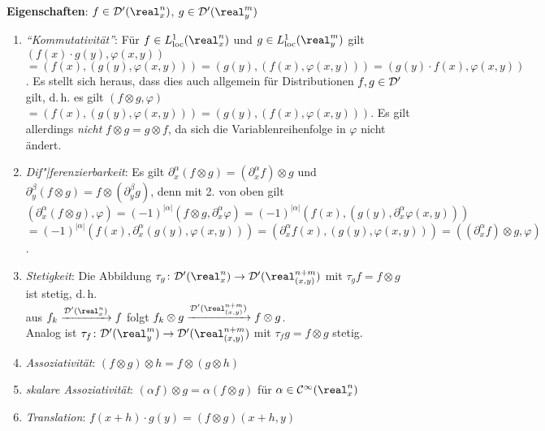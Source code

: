 \textbf{Eigenschaften}: $f \in \D'(\real^n_x)$, $g \in \D'(\real^m_y)$
\begin{enumerate}
    \item
    \emph{"`Kommutativität"'}:
    Für $f \in L^1_\loc(\real^n_x)$ und $g \in L^1_\loc(\real^m_y)$ gilt
    $(f(x) \cdot g(y), \varphi(x, y))$\\
    $= (f(x), (g(y), \varphi(x, y))) =
    (g(y), (f(x), \varphi(x, y))) = (g(y) \cdot f(x), \varphi(x, y))$.
    Es stellt sich heraus, dass dies auch allgemein für Distributionen
    $f, g \in \mathcal{D}'$ gilt, d.\,h. es gilt
    $(f \otimes g, \varphi)$\\
    $= (f(x), (g(y), \varphi(x, y))) = (g(y), (f(x), \varphi(x, y)))$.
    Es gilt allerdings \emph{nicht} $f \otimes g = g \otimes f$, da sich die
    Variablenreihenfolge in $\varphi$ nicht ändert.
    
    \item
    \emph{Dif"|ferenzierbarkeit}:
    Es gilt $\partial_x^\alpha (f \otimes g) = (\partial_x^\alpha f) \otimes g$
    und $\partial_y^\beta (f \otimes g) = f \otimes (\partial_y^\beta g)$,
    denn mit 2. von oben gilt
    $(\partial_x^\alpha (f \otimes g), \varphi) =
    (-1)^{|\alpha|} (f \otimes g, \partial_x^\alpha \varphi) =
    (-1)^{|\alpha|} (f(x), (g(y), \partial_x^\alpha \varphi(x, y)))$\\
    $= (-1)^{|\alpha|} (f(x), \partial_x^\alpha (g(y), \varphi(x, y))) =
    (\partial_x^\alpha f(x), (g(y), \varphi(x, y))) =
    ((\partial_x^\alpha f) \otimes g, \varphi)$.
    
    \item
    \emph{Stetigkeit}:
    Die Abbildung $\tau_g\colon \D'(\real^n_x) \rightarrow
    \D'(\real^{n+m}_{(x,y)})$ mit $\tau_g f = f \otimes g$ ist stetig, d.\,h.\\
    aus $f_k \xrightarrow{\D'(\real^n_x)} f$ folgt
    $f_k \otimes g \xrightarrow{\D'(\real^{n+m}_{(x,y)})} f \otimes g$.\\
    Analog ist $\tau_f\colon \D'(\real^m_y) \rightarrow
    \D'(\real^{n+m}_{(x,y)})$ mit $\tau_f g = f \otimes g$ stetig.
    
    \item
    \emph{Assoziativität}:
    $(f \otimes g) \otimes h = f \otimes (g \otimes h)$
    
    \item
    \emph{skalare Assoziativität}:
    $(\alpha f) \otimes g = \alpha (f \otimes g)$ für
    $\alpha \in \C^\infty(\real^n_x)$
    
    \item
    \emph{Translation}:
    $f(x + h) \cdot g(y) = (f \otimes g)(x + h, y)$
\end{enumerate}

